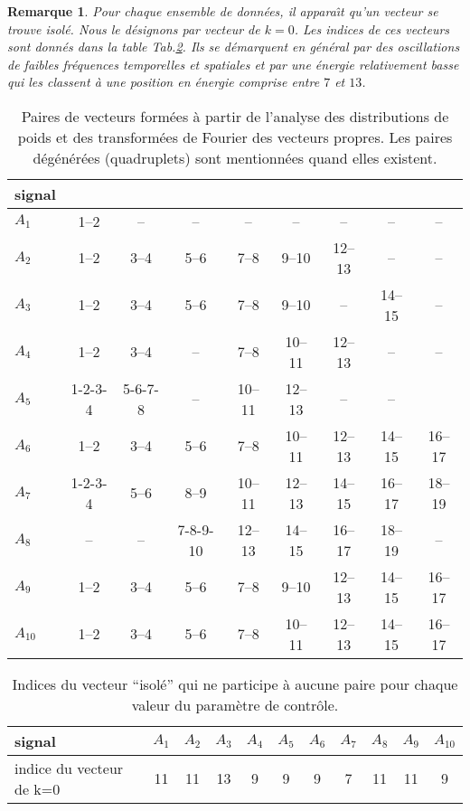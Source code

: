 \documentclass{book}
\newtheorem{rem}{Remarque}[chapter]
\begin{document}
\begin{rem}
Pour chaque ensemble de donn\'ees, il appara\^\i t qu'un vecteur se trouve
isol\'e. Nous 
le d\'esignons par vecteur de $k=0$. Les
indices de ces vecteurs sont donn\'es dans la table Tab.\ref{isol}. Ils se
d\'emarquent en g\'en\'eral par des oscillations de faibles fr\'equences
temporelles et spatiales et par une \'energie relativement basse qui les
classent \`a une 
position en \'energie comprise entre $7$ et $13$.
\end{rem}


\begin{table}[htb]
 \begin{center}
  \begin{tabular}{l|c|c|c|c|c|c|c|c}
signal      \\
\hline
${A}_1$ &1--2&--& -- &--&--&--&--&--\\
${A}_2$ &1--2&3--4&5--6 &7--8&9--10&12--13&--&--\\
${A}_3$ &1--2&3--4&5--6&7--8&9--10&--&14--15&--\\
${A}_4$ &1--2&3--4& -- &7--8&10--11&12--13&--&--\\
${A}_5$ &1-2-3-4&5-6-7-8&--&10--11&12--13&--&--\\
${A}_6$ &1--2&3--4 &5--6&7--8&10--11&12--13&14--15&16--17\\
${A}_7$ &1-2-3-4&5--6&8--9&10--11&12--13&14--15&16--17&18--19\\

${A}_8$ &--&--&7-8-9-10&12--13&14--15&16--17&18--19&--\\

${A}_9$ &1--2&3--4&5--6&7--8&9--10&12--13&14--15&16--17\\
${A}_{10}$ &1--2&3--4&5--6&7--8&10--11&12--13&14--15&16--17\\
\hline
  \end{tabular}
  \caption{Paires de vecteurs form\'ees \`a partir de l'analyse des
distributions de poids et des transform\'ees de Fourier des vecteurs
propres. Les paires d\'eg\'en\'er\'ees (quadruplets) sont
mentionn\'ees quand 
elles existent.}
  \label{tabpairpoi}
 \end{center}
\end{table}

\begin{table}[htb]
 \begin{center}
  \begin{tabular}{l|c|c|c|c|c|c|c|c|c|c}
signal & $A_1$ &$A_2$ &$A_3$  & $A_4$ & $A_5$ & $A_6$& $A_7$ &$A_8$ &$A_9$ & $A_{10}$ \\
\hline
indice du vecteur de k=0&11 &11 &13 & 9& 9 & 9 & 7  & 11  & 11 & 9
  \end{tabular}
  \caption{Indices du vecteur ``isol\'e'' qui ne participe \`a aucune
paire pour 
chaque valeur du param\`etre de contr\^ole.}
  \label{isol}
 \end{center}
\end{table}
\end{document}
